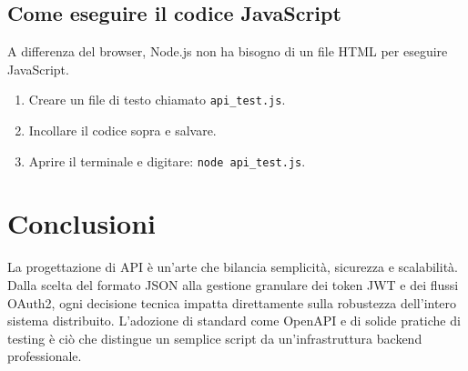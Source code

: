 \documentclass[11pt,a4paper]{report}
\begin{document}
\subsection{Come eseguire il codice JavaScript}
A differenza del browser, Node.js non ha bisogno di un file HTML per eseguire JavaScript.
\begin{enumerate}
    \item Creare un file di testo chiamato \texttt{api\_test.js}.
    \item Incollare il codice sopra e salvare.
    \item Aprire il terminale e digitare: \texttt{node api\_test.js}.
\end{enumerate}

\section{Conclusioni}
La progettazione di API è un'arte che bilancia semplicità, sicurezza e scalabilità. Dalla scelta del formato JSON alla gestione granulare dei token JWT e dei flussi OAuth2, ogni decisione tecnica impatta direttamente sulla robustezza dell'intero sistema distribuito. L'adozione di standard come OpenAPI e di solide pratiche di testing è ciò che distingue un semplice script da un'infrastruttura backend professionale.
\end{document}
